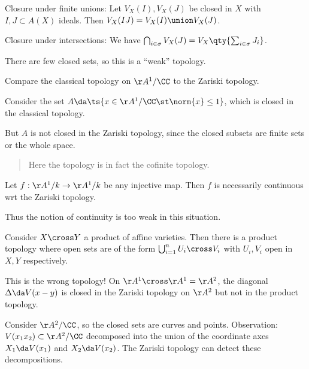 Closure under finite unions: Let \(V_X(I), V_X(J)\) be closed in \(X\)
with \(I, J \subset A(X)\) ideals. Then
\(V_X(IJ) = V_X(I) \union V_X(J)\).

Closure under intersections: We have
\(\bigcap_{i\in \sigma} V_X(J) = V_X\qty{ \sum_{i\in \sigma} J_i}\).

\begin{remark}

There are few closed sets, so this is a ``weak'' topology.

\end{remark}

\begin{example}

Compare the classical topology on \(\AA^1/\CC\) to the Zariski topology.

Consider the set \(A\da \ts{x\in \AA^1/\CC \st \norm{x} \leq 1}\), which
is closed in the classical topology.

But \(A\) is not closed in the Zariski topology, since the closed
subsets are finite sets or the whole space.

\begin{quote}
Here the topology is in fact the cofinite topology.
\end{quote}

\end{example}

\begin{example}

Let \(f: \AA^1/k\to \AA^1/k\) be any injective map. Then \(f\) is
necessarily continuous wrt the Zariski topology.

\end{example}

Thus the notion of continuity is too weak in this situation.

\begin{example}

Consider \(X\cross Y\) a product of affine varieties. Then there is a
product topology where open sets are of the form
\(\bigcup_{i=1}^n U_i \cross V_i\) with \(U_i, V_i\) open in \(X, Y\)
respectively.

This is the wrong topology! On \(\AA^1 \cross \AA^1 = \AA^2\), the
diagonal \(\Delta \da V(x-y)\) is closed in the Zariski topology on
\(\AA^2\) but not in the product topology.

\end{example}

\begin{example}

Consider \(\AA^2/\CC\), so the closed sets are curves and points.
Observation: \(V(x_1 x_2 ) \subset \AA^2/\CC\) decomposed into the union
of the coordinate axes \(X_1 \da V(x_1)\) and \(X_2 \da V(x_2)\). The
Zariski topology can detect these decompositions.

\end{example}

